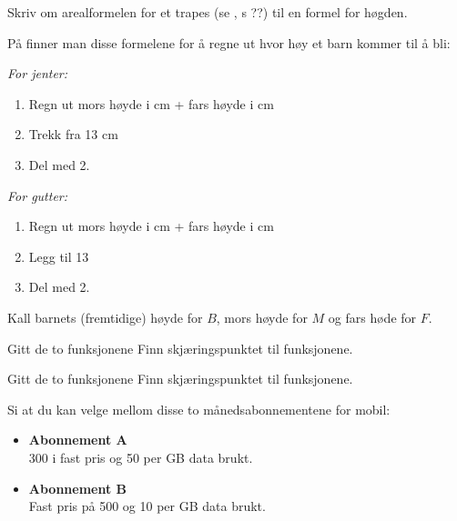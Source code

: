Skriv om arealformelen for et trapes (se \mb, s ??) til en formel for høgden.

På
 finner man disse formelene for å regne ut hvor høy et barn kommer til å bli:\os

\textit{For jenter:}
\begin{enumerate}
	\item Regn ut mors høyde i cm + fars høyde i cm
	\item Trekk fra 13 cm
	\item Del med 2.
\end{enumerate}

\textit{For gutter:}
\begin{enumerate}
	\item Regn ut mors høyde i cm + fars høyde i cm
	\item Legg til 13 
	\item Del med 2.
\end{enumerate}
Kall barnets (fremtidige) høyde for $ B $, mors høyde for $ M $ og fars høde for $ F $.

\nes
{}
Gitt de to funksjonene
Finn skjæringspunktet til funksjonene.

Gitt de to funksjonene
Finn skjæringspunktet til funksjonene.

Si at du kan velge mellom disse to månedsabonnementene for mobil:
\begin{itemize}
	\item \textbf{Abonnement A} \\
	300 i fast pris og 50 per GB data brukt.
	\item \textbf{Abonnement B} \\
	Fast pris på 500 og 10 per GB data brukt.
\end{itemize}

